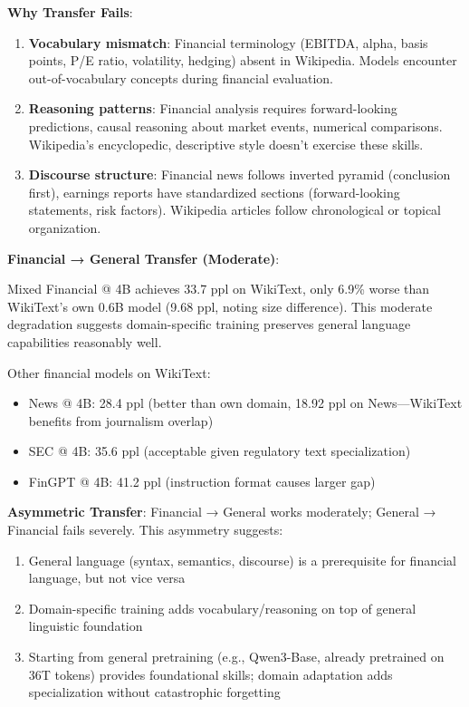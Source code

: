 \textbf{Why Transfer Fails}:
\begin{enumerate}
\item \textbf{Vocabulary mismatch}: Financial terminology (EBITDA, alpha, basis points, P/E ratio, volatility, hedging) absent in Wikipedia. Models encounter out-of-vocabulary concepts during financial evaluation.
\item \textbf{Reasoning patterns}: Financial analysis requires forward-looking predictions, causal reasoning about market events, numerical comparisons. Wikipedia's encyclopedic, descriptive style doesn't exercise these skills.
\item \textbf{Discourse structure}: Financial news follows inverted pyramid (conclusion first), earnings reports have standardized sections (forward-looking statements, risk factors). Wikipedia articles follow chronological or topical organization.
\end{enumerate}

\textbf{Financial → General Transfer (Moderate)}:

Mixed Financial @ 4B achieves 33.7 ppl on WikiText, only 6.9\% worse than WikiText's own 0.6B model (9.68 ppl, noting size difference). This moderate degradation suggests domain-specific training preserves general language capabilities reasonably well.

Other financial models on WikiText:
\begin{itemize}
\item News @ 4B: 28.4 ppl (better than own domain, 18.92 ppl on News—WikiText benefits from journalism overlap)
\item SEC @ 4B: 35.6 ppl (acceptable given regulatory text specialization)
\item FinGPT @ 4B: 41.2 ppl (instruction format causes larger gap)
\end{itemize}

\textbf{Asymmetric Transfer}: Financial → General works moderately; General → Financial fails severely. This asymmetry suggests:
\begin{enumerate}
\item General language (syntax, semantics, discourse) is a prerequisite for financial language, but not vice versa
\item Domain-specific training adds vocabulary/reasoning on top of general linguistic foundation
\item Starting from general pretraining (e.g., Qwen3-Base, already pretrained on 36T tokens) provides foundational skills; domain adaptation adds specialization without catastrophic forgetting
\end{enumerate}

